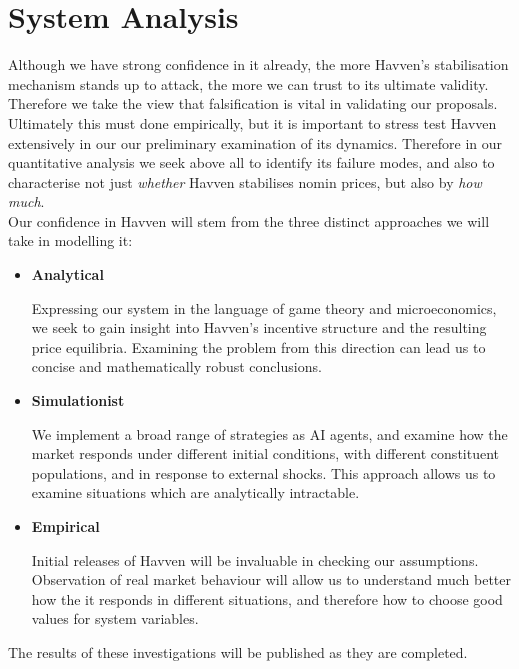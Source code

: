 \section{System Analysis}

Although we have strong confidence in it already, the more Havven's stabilisation mechanism
stands up to attack, the more we can trust to its ultimate validity.
Therefore we take the view that falsification is vital in validating our
proposals. \\

\noindent Ultimately this must done empirically, but it is important to stress test
Havven extensively in our our preliminary examination of its dynamics.
Therefore in our quantitative analysis we seek above all to identify its failure
modes, and also to characterise not just \textit{whether} Havven stabilises
nomin prices, but also by \textit{how much}.\\

\noindent Our confidence in Havven will stem from the three distinct approaches 
we will take in modelling it:
\begin{itemize}
    \item[] \textbf{Analytical}
    
	Expressing our system in the language of game theory and microeconomics,
	we seek to gain insight into Havven's incentive structure and the resulting
	price equilibria. Examining the problem from this direction can lead us to
	concise and mathematically robust conclusions.

    \item[] \textbf{Simulationist}

    We implement a broad range of strategies as AI agents, and examine how the
    market responds under different initial conditions, with different constituent
	populations, and in response to external shocks. This approach allows us to
	examine situations which are analytically intractable.

    \item[] \textbf{Empirical}

    Initial releases of Havven will be invaluable in checking our assumptions.
    Observation of real market behaviour will allow us to understand much better
    how the it responds in different situations, and therefore how to choose good values
    for system variables.
\end{itemize}

The results of these investigations will be published as they are completed.

